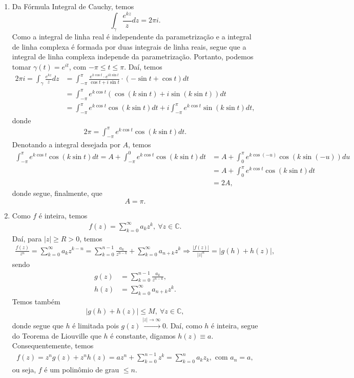 \documentclass[12pt,a4paper]{article}
\begin{document}
\begin{enumerate}
		\item Da Fórmula Integral de Cauchy, temos
		$$
		\int_{\gamma}\frac{e^{kz}}{z}dz = 2\pi i.
		$$
		Como a integral de linha real é independente da parametrização e a integral de linha complexa é formada por duas integrais de linha reais, segue que a integral de linha complexa independe da parametrização. Portanto, podemos tomar $\gamma(t) = e^{it}$, com $-\pi\leq t\leq\pi$. Daí, temos
		\begin{align*}
		2\pi i = \int_{\gamma}\frac{e^{kz}}{z}dz &= \int_{-\pi}^{\pi} \frac{e^{k\cos t}\cdot e^{ik\sin t}}{\cos t + i\sin t}\cdot (-\sin t +\cos t)dt \\
		&= \int_{-\pi}^{\pi} e^{k\cos t}(\cos(k\sin t) + i\sin(k\sin t))dt \\
		&= \int_{-\pi}^{\pi} e^{k\cos t}\cos(k\sin t) dt + i \int_{-\pi}^{\pi}e^{k\cos t}\sin(k\sin t)dt, 
		\end{align*}
		donde
		\begin{align*}
		2\pi = \int_{-\pi}^{\pi} e^{k\cos t}\cos(k\sin t) dt.
		\end{align*}
		Denotando a integral desejada por $A$, temos
		\begin{align*}
		\int_{-\pi}^{\pi} e^{k\cos t}\cos(k\sin t) dt = A + \int_{-\pi}^{0} e^{k\cos t}\cos(k\sin t) dt &= A + \int_{0}^{\pi} e^{k\cos (-u)}\cos(k\sin (-u)) du \\
		&= A + \int_{0}^{\pi} e^{k\cos t}\cos(k\sin t) dt \\
		&= 2A,
		\end{align*}
		donde segue, finalmente, que
		$$
		A = \pi.
		$$
		
		\item Como $f$ é inteira, temos
		\begin{align*}
		f(z) = \sum_{k=0}^{\infty} a_kz^k, \ \forall z\in\mathbb{C}.
		\end{align*}
		Daí, para $|z|\geq R > 0$, temos
		\begin{align*}
		\frac{f(z)}{z^n} = \sum_{k=0}^{\infty} a_kz^{k-n} = \sum_{k=0}^{n-1}\frac{a_k}{z^{n-k}} + \sum_{k=0}^{\infty}a_{n+k}z^k \Longrightarrow \frac{|f(z)|}{|z|^n} = |g(h) + h(z)|,
		\end{align*}
		sendo
		\begin{align*}
		g(z) &= \sum_{k=0}^{n-1}\frac{a_k}{z^{n-k}}, \\
		h(z) &= \sum_{k=0}^{\infty}a_{n+k}z^k.
		\end{align*}
		Temos também
		\begin{align*}
		|g(h) + h(z)| \leq M, \ \forall z\in\mathbb{C},
		\end{align*}
		donde segue que $h$ é limitada pois $g(z)\xrightarrow{|z|\to\infty}0$. Daí, como $h$ é inteira, segue do Teorema de Liouville que $h$ é constante, digamos $h(z)\equiv a$. Consequentemente, temos
		\begin{align*}
		f(z) = z^ng(z) + z^nh(z) = az^n + \sum_{k=0}^{n-1}z^k = \sum_{k=0}^{n}a_kz_k, \text{ com } a_n = a,
		\end{align*}
		ou seja, $f$ é um polinômio de grau $\leq n$.
		

\end{enumerate}
\end{document}
